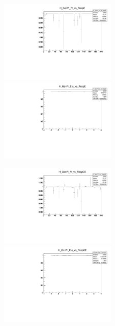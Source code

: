 \begin{figure}
\includegraphics[width=0.495\textwidth]{./plots_pdf/ECAL_plots/Prod6/PU/H_GenPi_Pt_vs_RespE.pdf}
\includegraphics[width=0.495\textwidth]{./plots_pdf/ECAL_plots/Prod6/PU/H_GenPi_Eta_vs_RespE.pdf}
\caption [PU - HLT vs offline PF ECAL cluster]{}
\label{fig:PU_ECAL_Offline_vs_Online_E}
\end{figure}

\begin{figure}
\includegraphics[width=0.495\textwidth]{./plots_pdf/ECAL_plots/Prod6/PU/H_GenPi_Pt_vs_RespCE.pdf}
\includegraphics[width=0.495\textwidth]{./plots_pdf/ECAL_plots/Prod6/PU/H_GenPi_Eta_vs_RespCE.pdf}
\caption [PU - HLT vs offline calibrated PF ECAL cluster]{}
\label{fig:PU_ECAL_Offline_vs_Online_CE}
\end{figure}       
